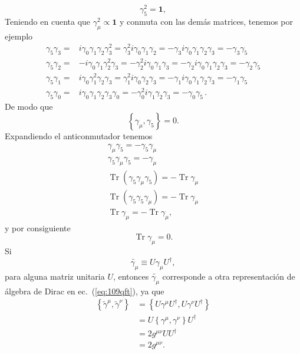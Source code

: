 \begin{equation}
  \gamma_5^2=\mathbf{1},
\end{equation}
Teniendo en cuenta que $\gamma_\mu^2\propto\mathbf{1}$ y conmuta con las demás matrices, tenemos por ejemplo
\begin{align}
  \gamma_5\gamma_3=&i\gamma_0\gamma_1\gamma_2\gamma_3^2=\gamma_3^2i\gamma_0\gamma_1\gamma_2=-\gamma_3i\gamma_0\gamma_1\gamma_2\gamma_3=-\gamma_3\gamma_5\nonumber\\
  \gamma_5\gamma_2=&-i\gamma_0\gamma_1\gamma_2^2\gamma_3=-\gamma_2^2i\gamma_0\gamma_1\gamma_3=-\gamma_2i\gamma_0\gamma_1\gamma_2\gamma_3=-\gamma_2\gamma_5\nonumber\\
  \gamma_5\gamma_1=&i\gamma_0\gamma_1^2\gamma_2\gamma_3=\gamma_1^2i\gamma_0\gamma_2\gamma_3=-\gamma_1i\gamma_0\gamma_1\gamma_2\gamma_3=-\gamma_1\gamma_5\nonumber\\
  \gamma_5\gamma_0=&i\gamma_0\gamma_1\gamma_2\gamma_3\gamma_0=-\gamma_0^2i\gamma_1\gamma_2\gamma_3=-\gamma_0\gamma_5\,.
\end{align}
De modo que
\begin{equation}
  \label{eq:218qft}
  \left\{\gamma_\mu,\gamma_5\right\}=0. 
\end{equation}
Expandiendo el anticonmutador tenemos
\begin{align}
  \gamma_\mu\gamma_5=-\gamma_5\gamma_\mu\nonumber\\
  \gamma_5\gamma_\mu\gamma_5=-\gamma_\mu\nonumber\\
\operatorname{Tr}\left(\gamma_5\gamma_\mu\gamma_5\right)=-\operatorname{Tr}\gamma_\mu\nonumber\\
\operatorname{Tr}\left(\gamma_5\gamma_5\gamma_\mu\right)=-\operatorname{Tr}\gamma_\mu\nonumber\\
\operatorname{Tr}\gamma_\mu=-\operatorname{Tr}\gamma_\mu,
\end{align}
y por consiguiente
\begin{equation}
  \operatorname{Tr}\gamma_\mu=0.
\end{equation}
Si
\begin{equation}
  \tilde{\gamma_\mu}\equiv U\gamma_\mu U^\dagger,
\end{equation}
para alguna matriz unitaria $U$, entonces $\tilde{\gamma_\mu}$ corresponde a otra representación de álgebra de Dirac en ec.~(\ref{eq:109qft}), ya que
\begin{align}
  \left\{\tilde\gamma^\mu,\tilde\gamma^\nu\right\}&=\left\{U\gamma^\mu U^\dagger,U\gamma^\nu U^\dagger\right\}\nonumber\\
  &=U\left\{\gamma^\mu,\gamma^\nu\right\}U^\dagger\nonumber\\
  &=2g^{\mu\nu}UU^\dagger\nonumber\\
  &=2g^{\mu\nu}.
\end{align}
